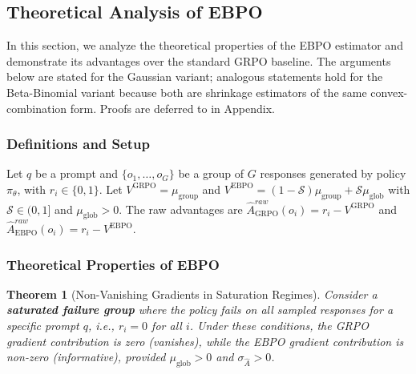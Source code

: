 \documentclass{article}
\theoremstyle{plain}
\newtheorem{theorem}{Theorem}[section]
\theoremstyle{definition}
\theoremstyle{remark}
\begin{document}
\subsection{Theoretical Analysis of EBPO}

In this section, we analyze the theoretical properties of the EBPO estimator and demonstrate its advantages over the standard GRPO baseline. The arguments below are stated for the Gaussian variant; analogous statements hold for the Beta-Binomial variant because both are shrinkage estimators of the same convex-combination form. Proofs are deferred to  in Appendix.

\subsubsection{Definitions and Setup}
Let $q$ be a prompt and $\{o_1, \dots, o_G\}$ be a group of $G$ responses generated by policy $\pi_\theta$, with $r_i \in \{0,1\}$. Let $V^{\text{GRPO}} = \mu_{\text{group}}$ and $V^{\text{EBPO}} = (1-\mathcal{S})\mu_{\text{group}} + \mathcal{S}\mu_{\text{glob}}$ with $\mathcal{S}\in(0,1]$ and $\mu_{\text{glob}}>0$. The raw advantages are $\hat{A}^{raw}_{\text{GRPO}}(o_i)=r_i-V^{\text{GRPO}}$ and $\hat{A}^{raw}_{\text{EBPO}}(o_i)=r_i-V^{\text{EBPO}}$.

\subsubsection{Theoretical Properties of EBPO}

\begin{theorem}[Non-Vanishing Gradients in Saturation Regimes]
\label{thm:non_vanishing}
Consider a \textbf{saturated failure group} where the policy fails on all sampled responses for a specific prompt $q$, i.e., $r_i = 0$ for all $i$. Under these conditions, the GRPO gradient contribution is zero (vanishes), while the EBPO gradient contribution is non-zero (informative), provided $\mu_{\text{glob}} > 0$ and $\sigma_{\hat{A}} > 0$.
\end{theorem}
\end{document}

